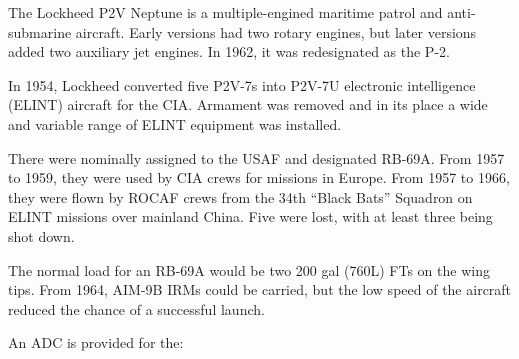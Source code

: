
The Lockheed P2V Neptune is a multiple-engined maritime patrol and anti-submarine aircraft. Early versions had two rotary engines, but later versions added two auxiliary jet engines. In 1962, it was redesignated as the P-2.

In 1954, Lockheed converted five P2V-7s into P2V-7U electronic intelligence (ELINT) aircraft for the CIA. Armament was removed and in its place a wide and variable range of ELINT equipment was installed.

There were nominally assigned to the USAF and designated RB-69A. From 1957 to 1959, they were used by CIA crews for missions in Europe. From 1957 to 1966, they were flown by ROCAF crews from the 34th “Black Bats” Squadron on ELINT missions over mainland China. Five were lost, with at least three being shot down.

The normal load for an RB-69A would be two 200 gal (760L) FTs on the wing tips. From 1964, AIM-9B IRMs could be carried, but the low speed of the aircraft reduced the chance of a successful launch.

An ADC is provided for the:
\begin{adclist}
\end{adclist}
